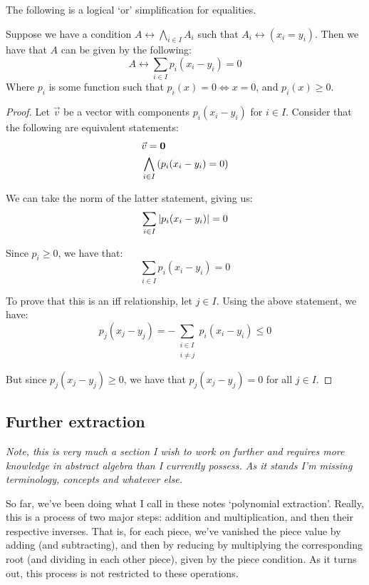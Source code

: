 \begin{theorem}
    The following is a logical `or' simplification for equalities.

    Suppose we have a condition $A\leftrightarrow \displaystyle\bigwedge_{i\in I}{A_i}$ such that $A_i\leftrightarrow(x_i=y_i)$. Then we have that $A$ can be given by the following:
    $$
        A\leftrightarrow\sum_{i\in I}{p_i(x_i-y_i)}=0
    $$
    Where $p_i$ is some function such that $p_i(x)=0\iff x=0$, and $p_i(x)\geq 0$.

    \begin{proof}
        Let $\vec{v}$ be a vector with components $p_i(x_i-y_i)$ for $i\in I$. Consider that the following are equivalent statements:
        \begin{align*}
            &\vec{v} = \mathbf{0} \\
            &\bigwedge_{i\in I}{\paren*{p_i(x_i-y_i) = 0}}
        \end{align*}

        We can take the norm of the latter statement, giving us:
        $$
            \sum_{i\in I}{\abs{p_i(x_i-y_i)}}=0
        $$

        Since $p_i\geq 0$, we have that:
        $$
            \sum_{i\in I}{p_i(x_i-y_i)}=0
        $$

        To prove that this is an iff relationship, let $j\in I$. Using the above statement, we have:
        $$
            p_j(x_j-y_j)=-\sum_{\substack{i\in I\\i\neq j}}{p_i(x_i-y_i)}\leq 0
        $$

        But since $p_j(x_j-y_j)\geq 0$, we have that $p_j(x_j-y_j)=0$ for all $j\in I$.
    \end{proof}
\end{theorem}

\subsection{Further extraction}
\textit{Note, this is very much a section I wish to work on further and requires more knowledge in abstract algebra than I currently possess. As it stands I'm missing terminology, concepts and whatever else.}

So far, we've been doing what I call in these notes `polynomial extraction'. Really, this is a process of two major steps: addition and multiplication, and then their respective inverses. That is, for each piece, we've vanished the piece value by adding (and subtracting), and then by reducing by multiplying the corresponding root (and dividing in each other piece), given by the piece condition. As it turns out, this process is not restricted to these operations.

